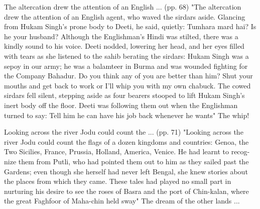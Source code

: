 The altercation drew the attention of an English ... (pp. 68)
"The altercation drew the attention of an English agent, who waved the sirdars aside. Glancing from Hukam Singh’s prone body to Deeti, he said, quietly: Tumhara mard hai? Is he your husband? Although the Englishman’s Hindi was stilted, there was a kindly sound to his voice. Deeti nodded, lowering her head, and her eyes filled with tears as she listened to the sahib berating the sirdars: Hukam Singh was a sepoy in our army; he was a balamteer in Burma and was wounded fighting for the Company Bahadur. Do you think any of you are better than him? Shut your mouths and get back to work or I’ll whip you with my own chabuck. The cowed sirdars fell silent, stepping aside as four bearers stooped to lift Hukam Singh’s inert body off the floor. Deeti was following them out when the Englishman turned to say: Tell him he can have his job back whenever he wants"
The whip!

Looking across the river Jodu could count the ... (pp. 71)
"Looking across the river Jodu could count the flags of a dozen kingdoms and countries: Genoa, the Two Sicilies, France, Prussia, Holland, America, Venice. He had learnt to recog-nize them from Putli, who had pointed them out to him as they sailed past the Gardens; even though she herself had never left Bengal, she knew stories about the places from which they came. These tales had played no small part in nurturing his desire to see the roses of Basra and the port of Chin-kalan, where the great Faghfoor of Maha-chin held sway"
The dream of the other lands ...


